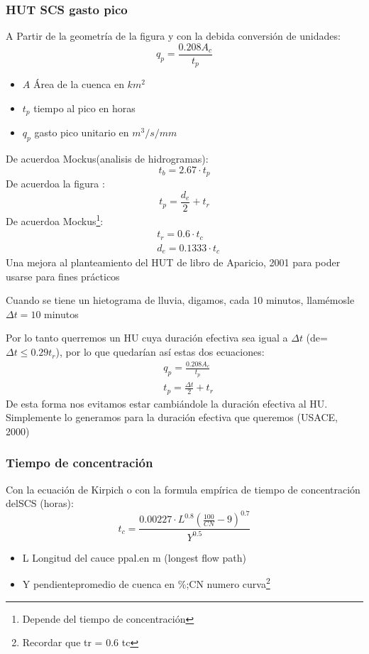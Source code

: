\subsubsection{HUT SCS gasto pico}
A Partir de la geometría de la figura y con la debida conversión de unidades:
\begin{equation}
    q_p = \frac{0.208 A_c}{t_p}
\end{equation}
\begin{notation}
    \begin{itemize}
        \item $A$ Área de la cuenca en $km^2$
        \item $t_p$ tiempo al pico en horas
        \item $q_p$ gasto pico unitario en $m^3/s/mm$
    \end{itemize}
\end{notation}
De acuerdoa Mockus(analisis de hidrogramas):
\begin{equation}
    t_b = 2.67 \cdot t_p
\end{equation}
De acuerdoa la figura :
\begin{equation}
    t_p = \frac{d_e}{2} + t_r
\end{equation}
De acuerdoa Mockus\footnote{Depende del tiempo de concentración}:
\begin{align}
    &t_r = 0.6 \cdot t_c\\
    &d_e = 0.1333 \cdot t_c
\end{align}
Una mejora al planteamiento del HUT de libro de Aparicio, 2001 para poder usarse para fines prácticos

Cuando se tiene un hietograma de lluvia, digamos, cada 10 minutos, llamémosle $\Delta t=10$ minutos

Por lo tanto querremos un HU cuya duración efectiva sea igual a $\Delta t$ (de= $\Delta t\leq 0.29 t_r$), por lo que quedarían así estas dos ecuaciones:
\begin{align*}
    &q_p = \frac{0.208 A_c}{t_p}\\
    &t_p = \frac{\Delta t}{2} + t_r
\end{align*}
De esta forma nos evitamos estar cambiándole la duración efectiva al HU. Simplemente lo generamos para la duración efectiva que queremos (USACE, 2000)
\subsubsection{Tiempo de concentración}
Con la ecuación de Kirpich o con la formula empírica de tiempo de concentración delSCS (horas):
\begin{equation}
    t_c =\frac{0.00227 \cdot L^{0.8}\left(\frac{100}{CN} - 9\right)^{0.7}}{Y^{0.5}}
\end{equation}
\begin{notation}
    \begin{itemize}
        \item L Longitud del cauce ppal.en m (longest flow path)
        \item Y pendientepromedio de cuenca en \%;CN numero curva\footnote{Recordar que tr = 0.6 tc}
    \end{itemize}
\end{notation}
